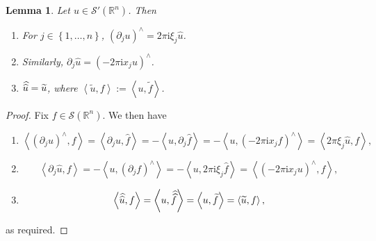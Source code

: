 \documentclass{book}
\newcommand{\scrS}{\mathscr{S}}
\newcommand{\bbR}{\mathbb{R}}
\renewcommand{\i}{\mathrm{i}}
\newcommand{\set}[1]{\left\{ {#1} \right\}}
\newcommand{\angles}[1]{\left\langle {#1} \right\rangle}
\newtheorem{lemma}[theorem]{Lemma}
\theoremstyle{definition}
\theoremstyle{remark}
\numberwithin{equation}{chapter}
\begin{document}
\begin{lemma}
    Let $u \in \scrS'(\bbR^n)$. Then
    \begin{enumerate}[label={\rm (\roman*)}]
        \item For $j \in \set{1,\dots,n}$, $(\partial_j u)^\wedge = 2\pi\i\xi_j\widehat{u}$.
        \item Similarly, $\partial_j \widehat{u} = (-2\pi\i x_j u)^\wedge$.
        \item $\skew{2.5}\widehat{\widehat{u}} = \widetilde{u}$, where $\angles{\widetilde{u},f} := \angles{u,\widetilde{f}}$.
    \end{enumerate}
\end{lemma}
\begin{proof}
    Fix $f \in \scrS(\bbR^n)$. We then have
    \begin{enumerate}[label=(\roman*)]
        \item 
        \begin{equation}
            \angles{ (\partial_j u)^\wedge, f } = \angles{ \partial_j u , \widehat{f} } 
                                                = - \angles{ u, \partial_j\widehat{f} }
                                                = - \angles{ u, (-2\pi\i x_j f)^\wedge }
                                                = \angles{ 2\pi\xi_j\widehat{u}, f },
        \end{equation}

        \item 
        \begin{equation}
            \angles{ \partial_j\widehat{u}, f } = - \angles{ u, (\partial_j f)^\wedge }
                                                = - \angles{ u, 2\pi\i\xi_j\widehat{f} }
                                                = \angles{ (-2\pi\i x_j u)^\wedge, f },
        \end{equation}
        
        \item 
        \begin{equation}
            \angles{ \skew{2.5}\widehat{\widehat{u}}, f } = \angles{ u, \skew{5.5}\widehat{\widehat{f}} }
                                                = \angles{ u, \widetilde{f} }
                                                = \angles{ \widetilde{u}, f },
        \end{equation}
    \end{enumerate}
    as required.
\end{proof}
\end{document}
